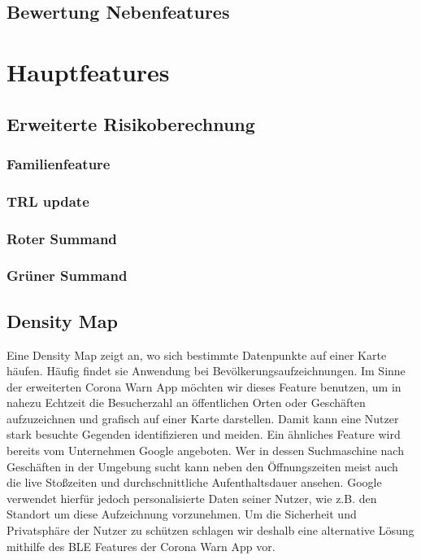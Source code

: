\documentclass[conference]{IEEEtran}
\begin{document}
\subsection{Bewertung Nebenfeatures}

\section{Hauptfeatures}
\subsection{Erweiterte Risikoberechnung}
\subsubsection{Familienfeature}
\subsubsection{TRL update}
\subsubsection{Roter Summand}
\subsubsection{Grüner Summand}

\subsection{Density Map}
Eine Density Map zeigt an, wo sich bestimmte Datenpunkte auf einer Karte häufen. 
Häufig findet sie Anwendung bei Bevölkerungsaufzeichnungen. 
Im Sinne der erweiterten Corona Warn App möchten wir dieses Feature benutzen, um in nahezu Echtzeit die Besucherzahl an öffentlichen Orten oder Geschäften aufzuzeichnen und grafisch auf einer Karte darstellen. 
Damit kann eine Nutzer stark besuchte Gegenden identifizieren und meiden. 
Ein ähnliches Feature wird bereits vom Unternehmen Google angeboten. 
Wer in dessen Suchmaschine nach Geschäften in der Umgebung sucht kann neben den Öffnungszeiten meist auch die live Stoßzeiten und durchschnittliche Aufenthaltsdauer ansehen. 
Google verwendet hierfür jedoch personalisierte Daten seiner Nutzer, wie z.B. den Standort um diese Aufzeichnung vorzunehmen. 
Um die Sicherheit und Privatsphäre der Nutzer zu schützen schlagen wir deshalb eine alternative Lösung mithilfe des BLE Features der Corona Warn App vor. \\
\end{document}
